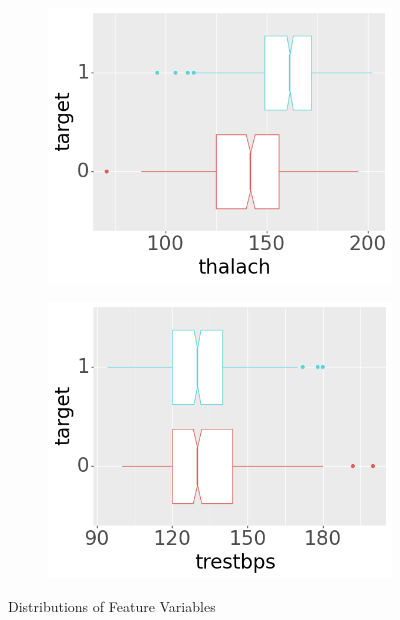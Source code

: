 \begin{figure}[btp]
\begin{subfigure}[b]{0.32\textwidth}
         \includegraphics[width=\textwidth]{plots/target-thalach}
     \end{subfigure}

     \begin{subfigure}[b]{0.32\textwidth}
         \centering
         \includegraphics[width=\textwidth]{plots/target-trestbps}
     \end{subfigure}

     \caption[Figure]{Distributions of Feature Variables} \label{fig:subdistributions}
\end{figure}

